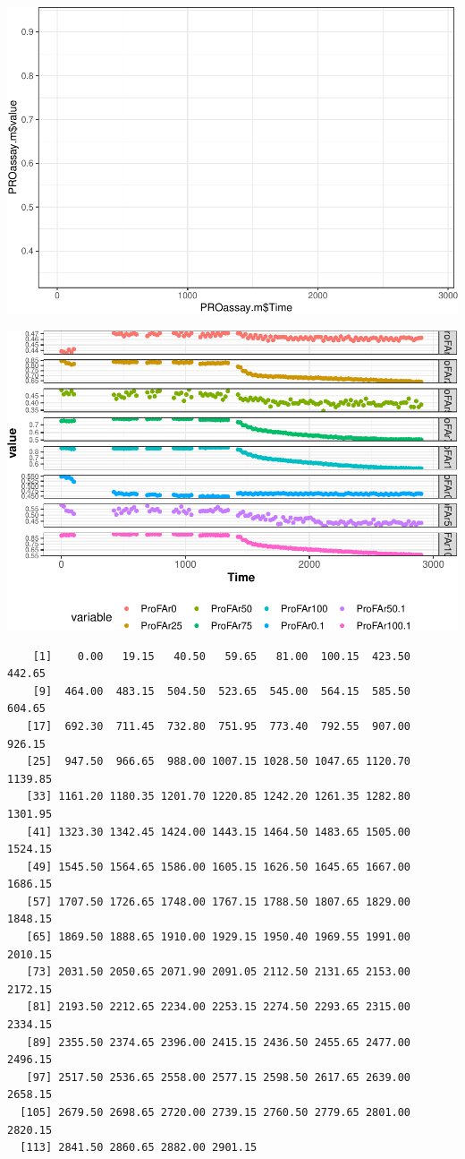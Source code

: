 \documentclass[12pt,twoside]{reedthesis}
\begin{document}
{  \begin{center}\includegraphics{tesis_files/figure-latex/Cinetics-2} \end{center}
  
  \begin{center}\includegraphics{tesis_files/figure-latex/Cinetics-3} \end{center}
  
  \begin{verbatim}
    [1]    0.00   19.15   40.50   59.65   81.00  100.15  423.50  442.65
    [9]  464.00  483.15  504.50  523.65  545.00  564.15  585.50  604.65
   [17]  692.30  711.45  732.80  751.95  773.40  792.55  907.00  926.15
   [25]  947.50  966.65  988.00 1007.15 1028.50 1047.65 1120.70 1139.85
   [33] 1161.20 1180.35 1201.70 1220.85 1242.20 1261.35 1282.80 1301.95
   [41] 1323.30 1342.45 1424.00 1443.15 1464.50 1483.65 1505.00 1524.15
   [49] 1545.50 1564.65 1586.00 1605.15 1626.50 1645.65 1667.00 1686.15
   [57] 1707.50 1726.65 1748.00 1767.15 1788.50 1807.65 1829.00 1848.15
   [65] 1869.50 1888.65 1910.00 1929.15 1950.40 1969.55 1991.00 2010.15
   [73] 2031.50 2050.65 2071.90 2091.05 2112.50 2131.65 2153.00 2172.15
   [81] 2193.50 2212.65 2234.00 2253.15 2274.50 2293.65 2315.00 2334.15
   [89] 2355.50 2374.65 2396.00 2415.15 2436.50 2455.65 2477.00 2496.15
   [97] 2517.50 2536.65 2558.00 2577.15 2598.50 2617.65 2639.00 2658.15
  [105] 2679.50 2698.65 2720.00 2739.15 2760.50 2779.65 2801.00 2820.15
  [113] 2841.50 2860.65 2882.00 2901.15
  \end{verbatim}
  
}
\end{document}
